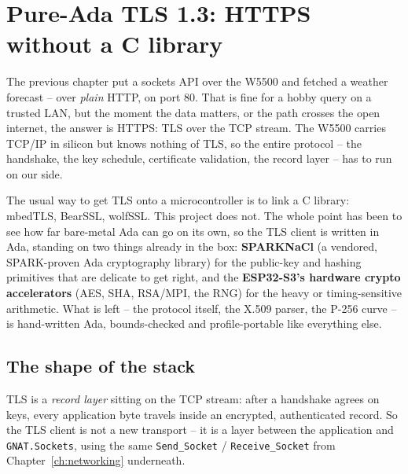 \chapter{Pure-Ada TLS 1.3: HTTPS without a C library}
\label{ch:tls}

The previous chapter put a sockets API over the W5500 and fetched a weather
forecast -- over \emph{plain} HTTP, on port 80. That is fine for a hobby query on
a trusted LAN, but the moment the data matters, or the path crosses the open
internet, the answer is HTTPS: TLS over the TCP stream. The W5500 carries TCP/IP
in silicon but knows nothing of TLS, so the entire protocol -- the handshake, the
key schedule, certificate validation, the record layer -- has to run on our side.

The usual way to get TLS onto a microcontroller is to link a C library: mbedTLS,
BearSSL, wolfSSL. This project does not. The whole point has been to see how far
bare-metal Ada can go on its own, so the TLS client is written in Ada, standing on
two things already in the box: \textbf{SPARKNaCl} (a vendored, SPARK-proven Ada
cryptography library) for the public-key and hashing primitives that are
delicate to get right, and the \textbf{ESP32-S3's hardware crypto accelerators}
(AES, SHA, RSA/MPI, the RNG) for the heavy or timing-sensitive arithmetic. What is
left -- the protocol itself, the X.509 parser, the P-256 curve -- is hand-written
Ada, bounds-checked and profile-portable like everything else.


\section{The shape of the stack}
\label{ch:tls:stack}

TLS is a \emph{record layer} sitting on the TCP stream: after a handshake agrees
on keys, every application byte travels inside an encrypted, authenticated record.
So the TLS client is not a new transport -- it is a layer between the application
and \texttt{GNAT.Sockets}, using the same \texttt{Send\_Socket} /
\texttt{Receive\_Socket} from Chapter~\ref{ch:networking} underneath.

